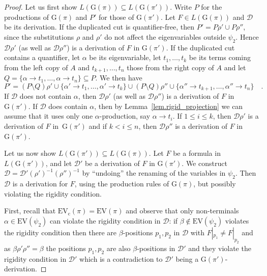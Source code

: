 \documentclass{LMCS}
\theoremstyle{plain}
\theoremstyle{definition}
\newcommand{\union}{\cup}
\newcommand{\Lang}[1]{L(#1)}	\newcommand{\Gram}[1]{\mathrm{G}(#1)}	\newcommand{\Gramreg}[1]{\mathrm{G}_0(#1)}
\newcommand{\DD}{\mathcal{D}}
\newcommand{\EV}{\mathrm{EV}}	\newcommand{\EVc}{\mathrm{EV_c}}	\newcommand{\Hseq}{\mathrm{H}}	\newcommand{\Bsub}{\mathrm{B}}	\newcommand{\terms}[1]{\mathrm{tm}(#1)}	\newcommand{\ev}[1]{\mathrm{ev}(#1)}	\newcommand{\cred}{\rightsquigarrow}	\newcommand{\credm}{\stackrel{\mathit{ne}}{\rightsquigarrow}}	\newcommand{\genrel}{\longrightarrow}
\begin{document}
\begin{proof}
Let us first show
$\Lang{\Gram{\pi}}\subseteq\Lang{\Gram{\pi'}}$. Write $P$ for the
productions of $\Gram{\pi}$ and $P'$ for those of $\Gram{\pi'}$. Let
$F\in\Lang{\Gram{\pi}}$ and $\DD$ be its derivation.  If the
duplicated cut is quantifier-free, then $P' = P\rho' \union P\rho''$,
since the substitutions $\rho$ and $\rho'$ do not affect the
eigenvariables outside $\psi_2$. Hence $\DD\rho'$ (as well as
$\DD\rho''$) is a derivation of $F$ in $\Gram{\pi'}$. If the
duplicated cut contains a quantifier, let $\alpha$ be its
eigenvariable, let $t_1,\ldots,t_k$ be its terms coming from the left
copy of $A$ and $t_{k+1},\ldots,t_n$ those from the right copy of $A$
and let $Q=\{ \alpha\to t_1,\ldots,\alpha\to t_n \}\subseteq P$. We
then have
\begin{equation*}
  P'=(P\setminus Q)\rho'\union\{ \alpha'\to t_1,\ldots,\alpha'\to t_k \}
  \union 
  (P\setminus Q)\rho'' \union \{ \alpha''\to t_{k+1},\ldots,
  \alpha''\to t_n \}\quad.
\end{equation*}
If $\DD$ does not contain $\alpha$, then $\DD\rho'$ (as well as
$\DD\rho''$) is a derivation of $F$ in $\Gram{\pi'}$. If $\DD$ does
contain $\alpha$, then by Lemma~\ref{lem.rigid_projection} we can
assume that it uses only one $\alpha$-production, say $\alpha\to
t_i$. If $1\leq i \leq k$, then $\DD\rho'$ is a derivation of $F$
in~$\Gram{\pi'}$ and if $k< i\leq n$, then $\DD\rho''$ is a derivation
of $F$ in~$\Gram{\pi'}$.

Let us now show $\Lang{\Gram{\pi'}}\subseteq\Lang{\Gram{\pi}}$. Let
$F$ be a formula in $\Lang{\Gram{\pi'}}$, and let $\DD'$ be a
derivation of $F$ in $\Gram{\pi'}$. We construct
$\DD=\DD'(\rho')^{-1}(\rho'')^{-1}$ by ``undoing'' the renaming of the
variables in $\psi_2$. Then $\DD$ is a derivation for $F$, using the
production rules of $\Gram{\pi}$, but possibly violating the rigidity
condition.

First, recall that $\EVc(\pi)=\EV(\pi)$ and observe that only
non-terminals $\alpha\in\EV(\psi_2)$ can violate the rigidity
condition in $\DD$: if $\beta\notin\EV(\psi_2)$ violates the rigidity
condition then there are $\beta$-positions $p_1,p_2$ in $\DD$ with
$F|_{p_1}\neq F|_{p_2}$ and as $\beta\rho'\rho''=\beta$ the positions
$p_1,p_2$ are also $\beta$-positions in $\DD'$ and they violate the
rigidity condition in $\DD'$ which is a contradiction to $\DD'$ being
a $\Gram{\pi'}$-derivation.


\end{proof}
\end{document}
